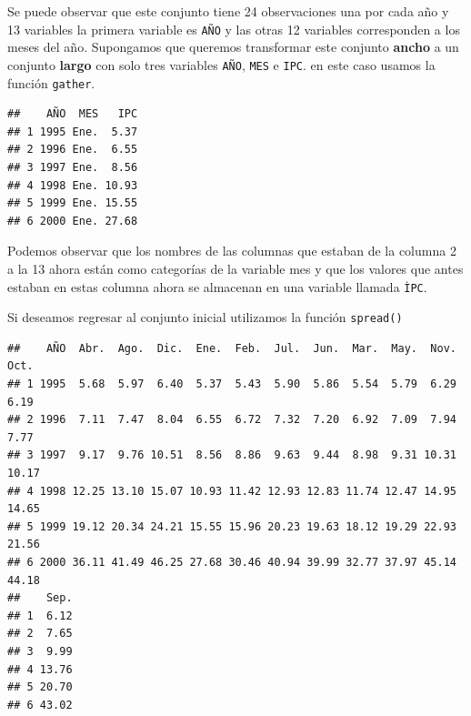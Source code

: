 \documentclass[letterpaper,]{book}
\newenvironment{Shaded}{\begin{snugshade}}{\end{snugshade}}
\newcommand{\DataTypeTok}[1]{\textcolor[rgb]{0.13,0.29,0.53}{#1}}
\newcommand{\DecValTok}[1]{\textcolor[rgb]{0.00,0.00,0.81}{#1}}
\newcommand{\KeywordTok}[1]{\textcolor[rgb]{0.13,0.29,0.53}{\textbf{#1}}}
\newcommand{\NormalTok}[1]{#1}
\newcommand{\OperatorTok}[1]{\textcolor[rgb]{0.81,0.36,0.00}{\textbf{#1}}}
\newcommand{\StringTok}[1]{\textcolor[rgb]{0.31,0.60,0.02}{#1}}
\begin{document}
Se puede observar que este conjunto tiene 24 observaciones una por cada año y 13 variables la primera variable es \texttt{AÑO} y las otras 12 variables corresponden a los meses del año. Supongamos que queremos transformar este conjunto \textbf{ancho} a un conjunto \textbf{largo} con solo tres variables \texttt{AÑO}, \texttt{MES} e \texttt{IPC}. en este caso usamos la función \texttt{gather}.

\begin{Shaded}
\end{Shaded}

\begin{verbatim}
##    AÑO  MES   IPC
## 1 1995 Ene.  5.37
## 2 1996 Ene.  6.55
## 3 1997 Ene.  8.56
## 4 1998 Ene. 10.93
## 5 1999 Ene. 15.55
## 6 2000 Ene. 27.68
\end{verbatim}

Podemos observar que los nombres de las columnas que estaban de la columna 2 a la 13 ahora están como categorías de la variable mes y que los valores que antes estaban en estas columna ahora se almacenan en una variable llamada \texttt{ÌPC}.

Si deseamos regresar al conjunto inicial utilizamos la función \texttt{spread()}

\begin{Shaded}
\end{Shaded}

\begin{verbatim}
##    AÑO  Abr.  Ago.  Dic.  Ene.  Feb.  Jul.  Jun.  Mar.  May.  Nov.  Oct.
## 1 1995  5.68  5.97  6.40  5.37  5.43  5.90  5.86  5.54  5.79  6.29  6.19
## 2 1996  7.11  7.47  8.04  6.55  6.72  7.32  7.20  6.92  7.09  7.94  7.77
## 3 1997  9.17  9.76 10.51  8.56  8.86  9.63  9.44  8.98  9.31 10.31 10.17
## 4 1998 12.25 13.10 15.07 10.93 11.42 12.93 12.83 11.74 12.47 14.95 14.65
## 5 1999 19.12 20.34 24.21 15.55 15.96 20.23 19.63 18.12 19.29 22.93 21.56
## 6 2000 36.11 41.49 46.25 27.68 30.46 40.94 39.99 32.77 37.97 45.14 44.18
##    Sep.
## 1  6.12
## 2  7.65
## 3  9.99
## 4 13.76
## 5 20.70
## 6 43.02
\end{verbatim}
\end{document}
